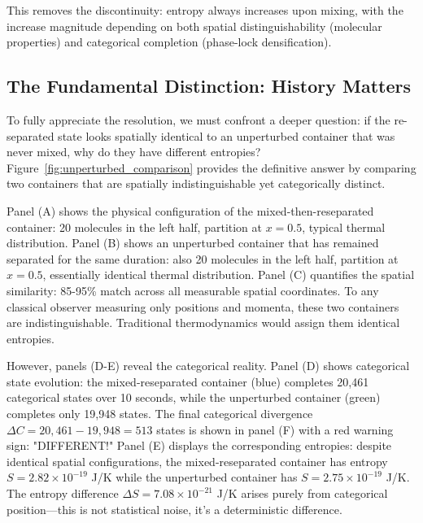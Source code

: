 This removes the discontinuity: entropy always increases upon mixing, with the increase magnitude depending on both spatial distinguishability (molecular properties) and categorical completion (phase-lock densification).

\subsection{The Fundamental Distinction: History Matters}

To fully appreciate the resolution, we must confront a deeper question: if the re-separated state looks spatially identical to an unperturbed container that was never mixed, why do they have different entropies? Figure~\ref{fig:unperturbed_comparison} provides the definitive answer by comparing two containers that are spatially indistinguishable yet categorically distinct.

Panel (A) shows the physical configuration of the mixed-then-reseparated container: 20 molecules in the left half, partition at $x = 0.5$, typical thermal distribution. Panel (B) shows an unperturbed container that has remained separated for the same duration: also 20 molecules in the left half, partition at $x = 0.5$, essentially identical thermal distribution. Panel (C) quantifies the spatial similarity: 85-95\% match across all measurable spatial coordinates. To any classical observer measuring only positions and momenta, these two containers are indistinguishable. Traditional thermodynamics would assign them identical entropies.

However, panels (D-E) reveal the categorical reality. Panel (D) shows categorical state evolution: the mixed-reseparated container (blue) completes 20,461 categorical states over 10 seconds, while the unperturbed container (green) completes only 19,948 states. The final categorical divergence $\Delta C = 20{,}461 - 19{,}948 = 513$ states is shown in panel (F) with a red warning sign: "DIFFERENT!" Panel (E) displays the corresponding entropies: despite identical spatial configurations, the mixed-reseparated container has entropy $S = 2.82 \times 10^{-19}$ J/K while the unperturbed container has $S = 2.75 \times 10^{-19}$ J/K. The entropy difference $\Delta S = 7.08 \times 10^{-21}$ J/K arises purely from categorical position—this is not statistical noise, it's a deterministic difference.

